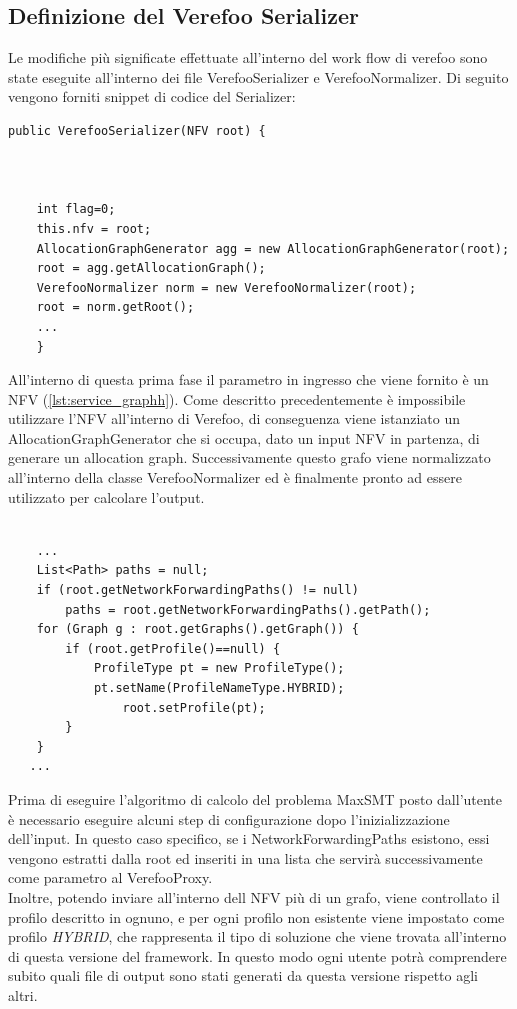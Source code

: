 \subsection{Definizione del Verefoo Serializer}
Le modifiche più significate effettuate all'interno del work flow di verefoo sono state eseguite all'interno dei file VerefooSerializer e VerefooNormalizer.
Di seguito vengono forniti snippet di codice del Serializer:

\lstset{language=Java} %

\begin{lstlisting}[caption={Inizializzazione e normalizzazione input}, label=lst:java_example1]
    public VerefooSerializer(NFV root) {



    int flag=0;
    this.nfv = root;
    AllocationGraphGenerator agg = new AllocationGraphGenerator(root);
    root = agg.getAllocationGraph();
    VerefooNormalizer norm = new VerefooNormalizer(root);
    root = norm.getRoot();
    ... 
    }
\end{lstlisting}
All'interno di questa prima fase il parametro in ingresso che viene fornito è un NFV (\ref{lst:service_graphh}). Come descritto precedentemente è impossibile utilizzare l'NFV 
all'interno di Verefoo, di conseguenza viene istanziato un AllocationGraphGenerator che si occupa, dato un input NFV in partenza, di generare un allocation graph. Successivamente 
questo grafo viene normalizzato all'interno della classe VerefooNormalizer ed è finalmente pronto ad essere utilizzato per calcolare l'output.
\begin{lstlisting}[caption={Calcolo dei Paths e dei profili nell'input}, label=lst:java_example2]
     
    ...
    List<Path> paths = null;
    if (root.getNetworkForwardingPaths() != null)
        paths = root.getNetworkForwardingPaths().getPath();
    for (Graph g : root.getGraphs().getGraph()) {
        if (root.getProfile()==null) {
            ProfileType pt = new ProfileType();
            pt.setName(ProfileNameType.HYBRID);
                root.setProfile(pt);
        } 
    }
   ...  
\end{lstlisting}

Prima di eseguire l'algoritmo di calcolo del problema MaxSMT posto dall'utente è necessario eseguire alcuni step di configurazione dopo l'inizializzazione dell'input.
In questo caso specifico, se i NetworkForwardingPaths esistono, essi vengono estratti dalla root ed inseriti in una lista che servirà successivamente come parametro al VerefooProxy.\\
Inoltre, potendo inviare all'interno dell NFV più di un grafo, viene controllato il profilo descritto in ognuno, e per ogni profilo non esistente viene impostato come profilo
\textit{HYBRID}, che rappresenta il tipo di soluzione che viene trovata all'interno di questa versione del framework. In questo modo ogni utente potrà comprendere subito quali
file di output sono stati generati da questa versione rispetto agli altri. 



